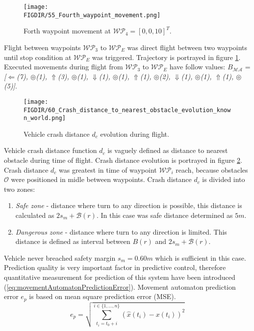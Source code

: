 \begin{figure}[H]
    \centering
    \texttt{[image: \\FIGDIR/55\_Fourth\_waypoint\_movement.png]}
    \caption{Forth waypoint movement at $\mathscr{WP}_4=[0,0,10]^T$.}
    \label{fig:55fourthObstacleknown}
\end{figure}
\noindent Flight between waypoints $\mathscr{WP}_3$ to $\mathscr{WP}_E$ was direct flight between two waypoints until stop condition at $\mathscr{WP}_E$ was triggered. Trajectory is portrayed in figure \ref{fig:55fourthObstacleknown}. Executed movements during flight from $\mathscr{WP}_3$ to $\mathscr{WP}_E$ have follow values: $B_{\mathscr{MA}}$ = \textit{[$\Leftarrow$(7), $\circledcirc$(1), $\Uparrow$(3), $\circledcirc$(1), $\Downarrow$(1), $\circledcirc$(1), $\Uparrow$(1), $\circledcirc$(2), $\Downarrow$(1), $\circledcirc$(1), $\Uparrow$(1), $\circledcirc$(5)]}.
\begin{figure}[H]
    \centering
    \texttt{[image: \\FIGDIR/60\_Crash\_distance\_to\_nearest\_obstacle\_evolution\_known\_world.png]}
    \caption{Vehicle crash distance $d_c$ evolution during flight.}
    \label{fig:vehicleCrashDistanceEvolutionKnownWorld}
\end{figure}
\noindent Vehicle crash distance function $d_c$ is vaguely defined as distance to nearest obstacle during time of flight. Crash distance evolution is portrayed in figure \ref{fig:vehicleCrashDistanceEvolutionKnownWorld}. Crash distance $d_c$ was greatest in time of waypoint $\mathscr{WP}_i$ reach, because obstacles $\mathscr{O}$ were positioned in midle between waypoints. Crash distance $d_c$ is divided into two zones:
\begin{enumerate}
    \item \textit{Safe zone} - distance where turn to any direction is possible, this distance is calculated as $2s_m+\mathscr{B}(r)$. In this case was safe distance determined as $5m$.
    \item \textit{Dangerous zone} - distance where turn to any direction is limited. This distance is defined as interval between $B(r)$ and $2s_m+\mathscr{B}(r)$.
\end{enumerate}
Vehicle never breached safety margin $s_m=0.60m$ which is sufficient in this case. Prediction quality is very important factor in predictive control, therefore quantitative measurement for prediction of this system have been introduced (\ref{eq:movementAutomatonPredictionError}). Movement automaton prediction error $e_p$ is based on mean square prediction error (MSE).
\begin{equation}\label{eq:movementAutomatonPredictionError}
    e_p=\sqrt{\sum_{t_i=t_0+i}^{i\in\{1,\dots,n\}} \left (\hat{x}(t_i)-x(t_i)\right)^2}    
\end{equation}


